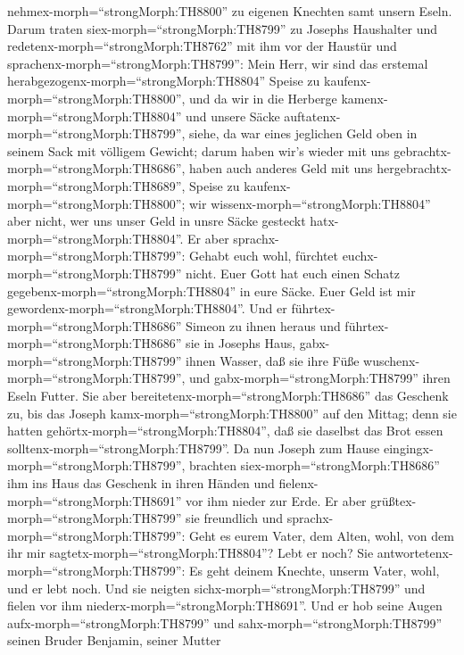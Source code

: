 nehmex-morph=``strongMorph:TH8800'' zu eigenen Knechten samt unsern
Eseln.  Darum traten siex-morph=``strongMorph:TH8799'' zu
Josephs Haushalter und redetenx-morph=``strongMorph:TH8762'' mit ihm vor
der Haustür  und sprachenx-morph=``strongMorph:TH8799'':
Mein Herr, wir sind das erstemal
herabgezogenx-morph=``strongMorph:TH8804'' Speise zu
kaufenx-morph=``strongMorph:TH8800'',  und da wir in die
Herberge kamenx-morph=``strongMorph:TH8804'' und unsere Säcke
auftatenx-morph=``strongMorph:TH8799'', siehe, da war eines jeglichen
Geld oben in seinem Sack mit völligem Gewicht; darum haben wir's wieder
mit uns gebrachtx-morph=``strongMorph:TH8686'',  haben auch
anderes Geld mit uns hergebrachtx-morph=``strongMorph:TH8689'', Speise
zu kaufenx-morph=``strongMorph:TH8800''; wir
wissenx-morph=``strongMorph:TH8804'' aber nicht, wer uns unser Geld in
unsre Säcke gesteckt hatx-morph=``strongMorph:TH8804''.  Er
aber sprachx-morph=``strongMorph:TH8799'': Gehabt euch wohl, fürchtet
euchx-morph=``strongMorph:TH8799'' nicht. Euer Gott hat euch einen
Schatz gegebenx-morph=``strongMorph:TH8804'' in eure Säcke. Euer Geld
ist mir gewordenx-morph=``strongMorph:TH8804''. Und er
führtex-morph=``strongMorph:TH8686'' Simeon zu ihnen heraus
 und führtex-morph=``strongMorph:TH8686'' sie in Josephs
Haus, gabx-morph=``strongMorph:TH8799'' ihnen Wasser, daß sie ihre Füße
wuschenx-morph=``strongMorph:TH8799'', und
gabx-morph=``strongMorph:TH8799'' ihren Eseln Futter.  Sie
aber bereitetenx-morph=``strongMorph:TH8686'' das Geschenk zu, bis das
Joseph kamx-morph=``strongMorph:TH8800'' auf den Mittag; denn sie hatten
gehörtx-morph=``strongMorph:TH8804'', daß sie daselbst das Brot essen
solltenx-morph=``strongMorph:TH8799''.  Da nun Joseph zum
Hause eingingx-morph=``strongMorph:TH8799'', brachten
siex-morph=``strongMorph:TH8686'' ihm ins Haus das Geschenk in ihren
Händen und fielenx-morph=``strongMorph:TH8691'' vor ihm nieder zur Erde.
 Er aber grüßtex-morph=``strongMorph:TH8799'' sie
freundlich und sprachx-morph=``strongMorph:TH8799'': Geht es eurem
Vater, dem Alten, wohl, von dem ihr mir
sagtetx-morph=``strongMorph:TH8804''? Lebt er noch?  Sie
antwortetenx-morph=``strongMorph:TH8799'': Es geht deinem Knechte,
unserm Vater, wohl, und er lebt noch. Und sie neigten
sichx-morph=``strongMorph:TH8799'' und fielen vor ihm
niederx-morph=``strongMorph:TH8691''.  Und er hob seine
Augen aufx-morph=``strongMorph:TH8799'' und
sahx-morph=``strongMorph:TH8799'' seinen Bruder Benjamin, seiner Mutter

